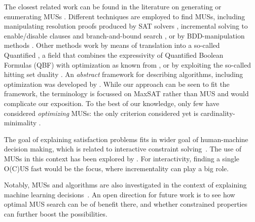 The closest related work can be found in the literature on generating or enumerating MUSs \cite{conf/sat/LynceM04}.
Different techniques are employed to find MUSs, including  manipulating resolution proofs produced by SAT solvers \cite{goldberg,DBLP:journals/fmsd/GershmanKS08,DBLP:conf/sat/DershowitzHN06}, incremental solving to enable/disable clauses and branch-and-bound search \cite{DBLP:conf/dac/OhMASM04}, or by BDD-manipulation methods \cite{huang}.
Other methods work by means of translation into a so-called Quantified \maxsat \cite{DBLP:journals/constraints/IgnatievJM16}, a field that combines the expressivity of Quantified Boolean Formulas (QBF)  with optimization as known from \maxsat {}, or by exploiting the so-called hitting set duality \cite{ignatiev2015smallest}. 
An \textit{abstract} framework for describing \hitsetbased algorithms, including optimization was developed by \citet{DBLP:conf/kr/SaikkoWJ16}. While our approach can be seen to fit the framework, the terminology is focussed on MaxSAT rather than MUS and would complicate our exposition.
To the best of our knowledge, only few have considered \emph{optimizing} MUSs: the only criterion considered yet is cardinality-minimality \cite{conf/sat/LynceM04,ignatiev2015smallest}. 






The goal of explaining satisfaction problems fits in wider goal of human-machine decision making, which is related to interactive constraint solving~\cite{putnam2019exploring}. The use of MUSs in this context has been explored by \citet{van2017kb}. For interactivity, finding a single O(C)US fast would be the focus, where incrementality can play a big role.

Notably, MUSs and \hitsetbased algorithms are also investigated in the context of explaining machine learning decisions~\cite{ignatiev2019abduction}. An open direction for future work is to see how optimal MUS search can be of benefit there, and whether constrained properties can further boost the possibilities.


